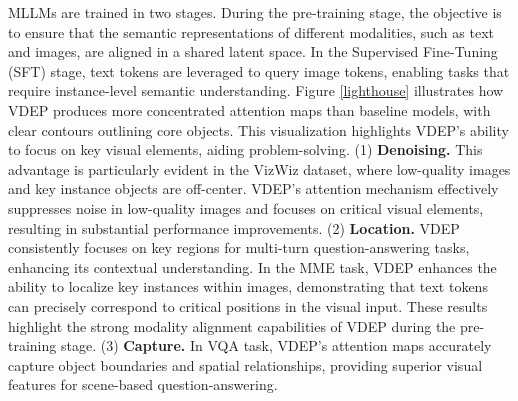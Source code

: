 MLLMs are trained in two stages. During the pre-training stage, the objective is to ensure that the semantic representations of different modalities, such as text and images, are aligned in a shared latent space. In the Supervised Fine-Tuning (SFT) stage, text tokens are leveraged to query image tokens, enabling tasks that require instance-level semantic understanding. Figure \ref{lighthouse} illustrates how VDEP produces more concentrated attention maps than baseline models, with clear contours outlining core objects. This visualization highlights VDEP's ability to focus on key visual elements, aiding problem-solving. (1) \textbf{Denoising.} This advantage is particularly evident in the VizWiz dataset, where low-quality images and key instance objects are off-center. VDEP's attention mechanism effectively suppresses noise in low-quality images and focuses on critical visual elements, resulting in substantial performance improvements.
(2) \textbf{Location.} VDEP consistently focuses on key regions for multi-turn question-answering tasks, enhancing its contextual understanding. In the MME task, VDEP enhances the ability to localize key instances within images, demonstrating that text tokens can precisely correspond to critical positions in the visual input. These results highlight the strong modality alignment capabilities of VDEP during the pre-training stage. (3) \textbf{Capture.} In VQA task, VDEP's attention maps accurately capture object boundaries and spatial relationships, providing superior visual features for scene-based question-answering. 

